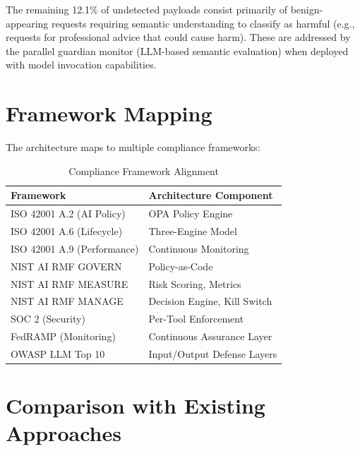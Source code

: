 \documentclass[conference]{IEEEtran}
\begin{document}
The remaining 12.1\% of undetected payloads consist primarily of benign-appearing requests requiring semantic understanding to classify as harmful (e.g., requests for professional advice that could cause harm). These are addressed by the parallel guardian monitor (LLM-based semantic evaluation) when deployed with model invocation capabilities.

\section{Framework Mapping}

The architecture maps to multiple compliance frameworks:

\begin{table}[htbp]
\caption{Compliance Framework Alignment}
\centering
\begin{tabular}{|l|l|}
\hline
\textbf{Framework} & \textbf{Architecture Component} \\
\hline
ISO 42001 A.2 (AI Policy) & OPA Policy Engine \\
\hline
ISO 42001 A.6 (Lifecycle) & Three-Engine Model \\
\hline
ISO 42001 A.9 (Performance) & Continuous Monitoring \\
\hline
NIST AI RMF GOVERN & Policy-as-Code \\
\hline
NIST AI RMF MEASURE & Risk Scoring, Metrics \\
\hline
NIST AI RMF MANAGE & Decision Engine, Kill Switch \\
\hline
SOC 2 (Security) & Per-Tool Enforcement \\
\hline
FedRAMP (Monitoring) & Continuous Assurance Layer \\
\hline
OWASP LLM Top 10 & Input/Output Defense Layers \\
\hline
\end{tabular}
\end{table}

\section{Comparison with Existing Approaches}
\end{document}
